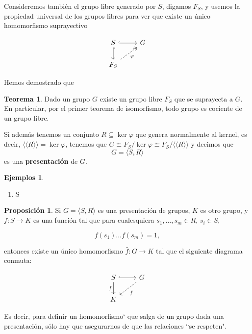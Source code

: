 \documentclass[spanish]{book}
\theoremstyle{definition}
\newtheorem*{teo}{Teorema}
\newtheorem*{prop}{Proposición}
\newtheorem*{ejems}{Ejemplos}
\begin{document}
	Consideremos también el grupo libre generado por $S$, digamos $F_S$, y usemos la propiedad universal de los grupos libres para ver que existe un único homomorfismo suprayectivo

	\[\begin{tikzcd}
		S\arrow[r,hook]\arrow[d,hook]&G\\
		F_S\arrow[ur,->>,dashed,swap,"\varphi"]
	\end{tikzcd}\]

	Hemos demostrado que
	
	\begin{teo}
		Dado un grupo $G$ existe un grupo libre $F_S$ que se suprayecta a $G$. En particular, por el primer teorema de isomorfismo, todo grupo es cociente de un grupo libre.
	\end{teo}
	
	Si además tenemos un conjunto $R\subseteq\ker\varphi$ que genera normalmente al kernel, es decir, $\langle\langle R\rangle\rangle =\ker\varphi$, tenemos que $G\cong F_S/\ker\varphi\cong F_S/\langle\langle R\rangle\rangle$ y decimos que
	\[G=\langle S,R\rangle\]
	es una \textbf{presentación} de $G$.
	
	\begin{ejems}
		\begin{enumerate}
			\item S
		\end{enumerate}
	\end{ejems}
	
	\begin{prop}
		Si $G=\langle S,R\rangle$ es una presentación de grupos, $K$ es otro grupo, y $f:S\to K$ es una función tal que para cualesquiera $s_1,\ldots,s_m\in R$, $s_i\in S$,
		
		\[f(s_1)\ldots f(s_m)=1,\]
		
		entonces existe un único homomorfismo $\bar{f}:G\to K$ tal que el siguiente diagrama conmuta:
		
		\[\begin{tikzcd}
			S\arrow[r,hook]\arrow[d,swap,"f"]&G\arrow[dl,dashed,"\bar{f}"]\\
			K
		\end{tikzcd}\]
	\end{prop}
	Es decir, para definir un homomorfismo` que salga de un grupo dada una presentación, sólo hay que asegurarnos de que las relaciones ``se respeten".
\end{document}
